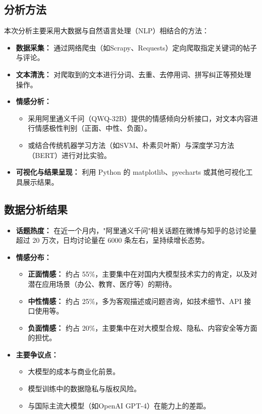 \documentclass[12pt,a4paper]{ctexart}
\begin{document}
\subsection{分析方法}
本次分析主要采用大数据与自然语言处理（NLP）相结合的方法：
\begin{itemize}
    \item \textbf{数据采集：} 通过网络爬虫（如Scrapy、Requests）定向爬取指定关键词的帖子与评论。
    \item \textbf{文本清洗：} 对爬取到的文本进行分词、去重、去停用词、拼写纠正等预处理操作。
    \item \textbf{情感分析：}
    \begin{itemize}
        \item 采用阿里通义千问（QWQ-32B）提供的情感倾向分析接口，对文本内容进行情感极性判别（正面、中性、负面）。
        \item 或结合传统机器学习方法（如SVM、朴素贝叶斯）与深度学习方法（BERT）进行对比实验。
    \end{itemize}
    \item \textbf{可视化与结果呈现：} 利用 Python 的 matplotlib、pyecharts 或其他可视化工具展示结果。
\end{itemize}

\subsection{数据分析结果}
\begin{itemize}
    \item \textbf{话题热度：} 在近一个月内，"阿里通义千问"相关话题在微博与知乎的总讨论量超过 20 万次，日均讨论量在 6000 条左右，呈持续增长态势。
    \item \textbf{情感分布：}
    \begin{itemize}
        \item \textbf{正面情感：} 约占 55\%，主要集中在对国内大模型技术实力的肯定，以及对潜在应用场景（办公、教育、医疗等）的期待。
        \item \textbf{中性情感：} 约占 25\%，多为客观描述或问题咨询，如技术细节、API 接口使用等。
        \item \textbf{负面情感：} 约占 20\%，主要集中在对大模型合规、隐私、内容安全等方面的担忧。
    \end{itemize}
    \item \textbf{主要争议点：}
    \begin{itemize}
        \item 大模型的成本与商业化前景。
        \item 模型训练中的数据隐私与版权风险。
        \item 与国际主流大模型（如OpenAI GPT-4）在能力上的差距。
    \end{itemize}
\end{itemize}
\end{document}
